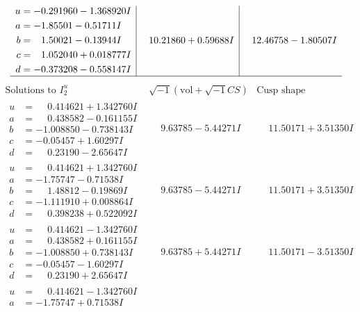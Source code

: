 \documentclass[1p]{elsarticle_modified}
\theoremstyle{definition}
\newcommand{\I}{\sqrt{-1}}
\begin{document}
$$\begin{array}{c|c|c}
\begin{aligned}
u &= -0.291960 - 1.368920 I \\
a &= -1.85501 - 0.51711 I \\
b &= \phantom{-}1.50021 - 0.13944 I \\
c &= \phantom{-}1.052040 + 0.018777 I \\
d &= -0.373208 - 0.558147 I\end{aligned}
 & \phantom{-}10.21860 + 0.59688 I & \phantom{-}12.46758 - 1.80507 I\\
 \hline 
 \end{array}$$\newpage$$\begin{array}{c|c|c}  
\text{Solutions to }I^u_{2}& \I (\text{vol} + \sqrt{-1}CS) & \text{Cusp shape}\\
 \hline 
\begin{aligned}
u &= \phantom{-}0.414621 + 1.342760 I \\
a &= \phantom{-}0.438582 - 0.161155 I \\
b &= -1.008850 - 0.738143 I \\
c &= -0.05457 + 1.60297 I \\
d &= \phantom{-}0.23190 - 2.65647 I\end{aligned}
 & \phantom{-}9.63785 - 5.44271 I & \phantom{-}11.50171 + 3.51350 I \\ \hline\begin{aligned}
u &= \phantom{-}0.414621 + 1.342760 I \\
a &= -1.75747 - 0.71538 I \\
b &= \phantom{-}1.48812 - 0.19869 I \\
c &= -1.111910 + 0.008864 I \\
d &= \phantom{-}0.398238 + 0.522092 I\end{aligned}
 & \phantom{-}9.63785 - 5.44271 I & \phantom{-}11.50171 + 3.51350 I \\ \hline\begin{aligned}
u &= \phantom{-}0.414621 - 1.342760 I \\
a &= \phantom{-}0.438582 + 0.161155 I \\
b &= -1.008850 + 0.738143 I \\
c &= -0.05457 - 1.60297 I \\
d &= \phantom{-}0.23190 + 2.65647 I\end{aligned}
 & \phantom{-}9.63785 + 5.44271 I & \phantom{-}11.50171 - 3.51350 I \\ \hline\begin{aligned}
u &= \phantom{-}0.414621 - 1.342760 I \\
a &= -1.75747 + 0.71538 I \\

\end{aligned}
\end{array}$$
\end{document}
